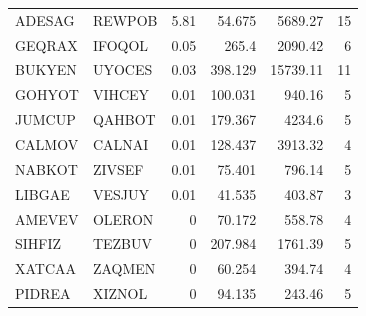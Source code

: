 \documentclass[11pt]{article}
\begin{document}
\begin{table}[htbp]
{\begin{tabular}{l|l|r|r|r|r}
ADESAG   & REWPOB   & 5.81             & 54.675          & 5689.27               & 15           \\
GEQRAX   & IFOQOL   & 0.05             & 265.4           & 2090.42               & 6            \\
BUKYEN   & UYOCES   & 0.03             & 398.129         & 15739.11              & 11           \\
GOHYOT   & VIHCEY   & 0.01             & 100.031         & 940.16                & 5            \\
JUMCUP   & QAHBOT   & 0.01             & 179.367         & 4234.6                & 5            \\
CALMOV   & CALNAI   & 0.01             & 128.437         & 3913.32               & 4            \\
NABKOT   & ZIVSEF   & 0.01             & 75.401          & 796.14                & 5            \\
LIBGAE   & VESJUY   & 0.01             & 41.535          & 403.87                & 3            \\
AMEVEV   & OLERON   & 0                & 70.172          & 558.78                & 4            \\
SIHFIZ   & TEZBUV   & 0                & 207.984         & 1761.39               & 5            \\
XATCAA   & ZAQMEN   & 0                & 60.254          & 394.74                & 4            \\
PIDREA   & XIZNOL   & 0                & 94.135          & 243.46                & 5              
\end{tabular}
}
\end{table}
\end{document}
